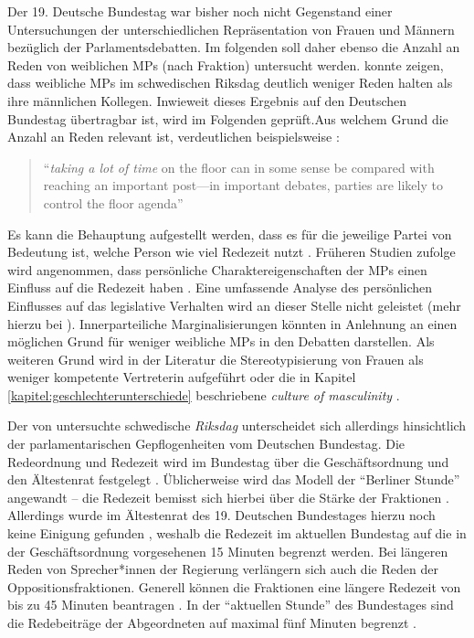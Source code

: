 \documentclass[12pt, 
    twoside=false, 
    bibliography=totoc, 
    numbers=endperiod, 
    headings=normal, 
    toc=chapterentrydotfill
    ]{scrbook}
\begin{document}
Der 19. Deutsche Bundestag war bisher noch nicht Gegenstand einer Untersuchungen der unterschiedlichen Repräsentation von Frauen und Männern bezüglich der Parlamentsdebatten. Im folgenden soll daher ebenso die Anzahl an Reden von weiblichen MPs (nach Fraktion) untersucht werden. \textcite{back_2014} konnte zeigen, dass weibliche MPs im schwedischen Riksdag deutlich weniger Reden halten als ihre männlichen Kollegen. Inwieweit dieses Ergebnis auf den Deutschen Bundestag übertragbar ist, wird im Folgenden geprüft.Aus welchem Grund die Anzahl an Reden relevant ist, verdeutlichen beispielsweise \textcite{back_2014}:

\citereset
\begin{quote}
     \enquote{\emph{taking a lot of time} on the floor can in some sense be compared with reaching an important post—in important debates, parties are likely to control the floor agenda} \parencites[507]{back_2014}
\end{quote}

Es kann die Behauptung aufgestellt werden, dass es für die jeweilige Partei von Bedeutung ist, welche Person wie viel Redezeit nutzt \parencite[vgl.][]{proksch_2012}. 
%
Früheren Studien zufolge wird angenommen, dass persönliche Charaktereigenschaften der MPs einen Einfluss auf die Redezeit haben \parencite[505]{back_2014}. Eine umfassende Analyse des persönlichen Einflusses auf das legislative Verhalten wird an dieser Stelle nicht geleistet (mehr hierzu bei \textcite{saalfeld_2011}). Innerparteiliche Marginalisierungen könnten in Anlehnung an \textcite[507]{back_2014} einen möglichen Grund für weniger weibliche MPs in den Debatten darstellen. Als weiteren Grund wird in der Literatur die Stereotypisierung von Frauen als weniger kompetente Vertreterin aufgeführt oder die in Kapitel \ref{kapitel:geschlechterunterschiede} beschriebene \emph{culture of masculinity} \parencites[507]{back_2014}{lovenduski_2005}. 

Der von \textcite{back_2014} untersuchte schwedische \emph{Riksdag} unterscheidet sich allerdings hinsichtlich der parlamentarischen Gepflogenheiten vom Deutschen Bundestag. Die Redeordnung und Redezeit wird im Bundestag über die Geschäftsordnung und den Ältestenrat festgelegt \parencite[64f.]{linn_2018}. Üblicherweise wird das Modell der \enquote{Berliner Stunde} angewandt -- die Redezeit bemisst sich hierbei über die Stärke der Fraktionen \parencite[vgl.][]{schreiner_2005}. Allerdings wurde im Ältestenrat des 19. Deutschen Bundestages hierzu noch keine Einigung gefunden \parencite[64]{linn_2018}, weshalb die Redezeit im aktuellen Bundestag auf die in der Geschäftsordnung vorgesehenen 15 Minuten begrenzt werden. Bei längeren Reden von Sprecher*innen der Regierung verlängern sich auch die Reden der Oppositionsfraktionen. Generell können die Fraktionen eine längere Redezeit von bis zu 45 Minuten beantragen \parencite{bundestag_2019}. In der \enquote{aktuellen Stunde} des Bundestages sind die Redebeiträge der Abgeordneten auf maximal fünf Minuten begrenzt \parencites[68]{linn_2018}[]{bundestag_2019}.
\end{document}
